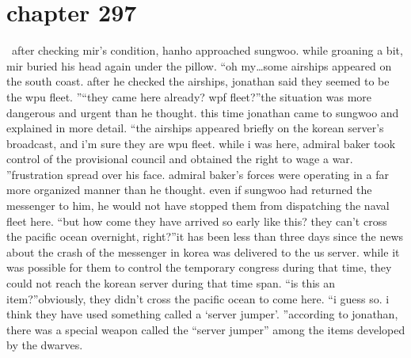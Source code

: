 \section{chapter 297}






 after checking mir’s condition, hanho approached sungwoo.
while groaning a bit, mir buried his head again under the pillow.
“oh my…some airships appeared on the south coast.
 after he checked the airships, jonathan said they seemed to be the wpu fleet.
”“they came here already? wpf fleet?”the situation was more dangerous and urgent than he thought.
 this time jonathan came to sungwoo and explained in more detail.
“the airships appeared briefly on the korean server’s broadcast, and i’m sure they are wpu fleet.
 while i was here, admiral baker took control of the provisional council and obtained the right to wage a war.
”frustration spread over his face.
 admiral baker’s forces were operating in a far more organized manner than he thought.
 even if sungwoo had returned the messenger to him, he would not have stopped them from dispatching the naval fleet here.
“but how come they have arrived so early like this? they can’t cross the pacific ocean overnight, right?”it has been less than three days since the news about the crash of the messenger in korea was delivered to the us server.
 while it was possible for them to control the temporary congress during that time, they could not reach the korean server during that time span.
“is this an item?”obviously, they didn’t cross the pacific ocean to come here.
“i guess so.
 i think they have used something called a ‘server jumper’.
”according to jonathan, there was a special weapon called the “server jumper” among the items developed by the dwarves.

